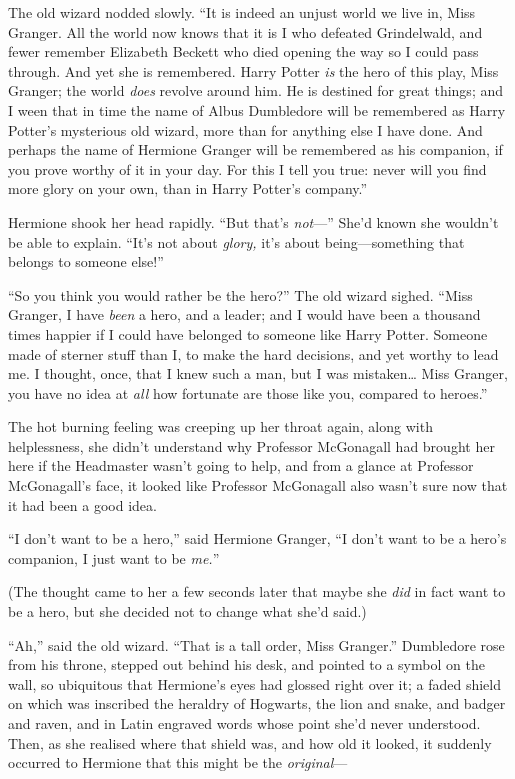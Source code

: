 The old wizard nodded slowly. ``It is indeed an unjust world we live in,
Miss Granger. All the world now knows that it is I who defeated
Grindelwald, and fewer remember Elizabeth Beckett who died opening the
way so I could pass through. And yet she is remembered. Harry Potter
\emph{is} the hero of this play, Miss Granger; the world \emph{does}
revolve around him. He is destined for great things; and I ween that in
time the name of Albus Dumbledore will be remembered as Harry Potter's
mysterious old wizard, more than for anything else I have done. And
perhaps the name of Hermione Granger will be remembered as his
companion, if you prove worthy of it in your day. For this I tell you
true: never will you find more glory on your own, than in Harry Potter's
company.''

Hermione shook her head rapidly. ``But that's \emph{not}---'' She'd
known she wouldn't be able to explain. ``It's not about \emph{glory,}
it's about being---something that belongs to someone else!''

``So you think you would rather be the hero?'' The old wizard sighed.
``Miss Granger, I have \emph{been} a hero, and a leader; and I would
have been a thousand times happier if I could have belonged to someone
like Harry Potter. Someone made of sterner stuff than I, to make the
hard decisions, and yet worthy to lead me. I thought, once, that I knew
such a man, but I was mistaken\ldots{} Miss Granger, you have no idea at
\emph{all} how fortunate are those like you, compared to heroes.''

The hot burning feeling was creeping up her throat again, along with
helplessness, she didn't understand why Professor McGonagall had brought
her here if the Headmaster wasn't going to help, and from a glance at
Professor McGonagall's face, it looked like Professor McGonagall also
wasn't sure now that it had been a good idea.

``I don't want to be a hero,'' said Hermione Granger, ``I don't want to
be a hero's companion, I just want to be \emph{me.}''

(The thought came to her a few seconds later that maybe she \emph{did}
in fact want to be a hero, but she decided not to change what she'd
said.)

``Ah,'' said the old wizard. ``That is a tall order, Miss Granger.''
Dumbledore rose from his throne, stepped out behind his desk, and
pointed to a symbol on the wall, so ubiquitous that Hermione's eyes had
glossed right over it; a faded shield on which was inscribed the
heraldry of Hogwarts, the lion and snake, and badger and raven, and in
Latin engraved words whose point she'd never understood. Then, as she
realised where that shield was, and how old it looked, it suddenly
occurred to Hermione that this might be the \emph{original}---

